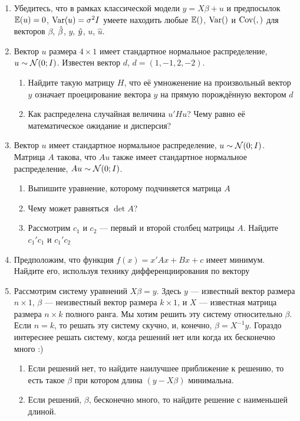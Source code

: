 \documentclass[12pt, a4paper]{article}\usepackage[]{graphicx}\usepackage[]{color}
\begin{document}
\begin{enumerate}

\item Убедитесь, что в рамках классической модели $y=X\beta + u$ и предпосылок $\mathbb{E}(u) = 0$, $\operatorname{Var}(u) = \sigma^2 I$  умеете находить любые $\mathbb{E}()$, $\operatorname{Var}()$ и $\operatorname{Cov}(,)$ для векторов $\beta$, $\hat{\beta}$, $y$, $\hat{y}$, $u$, $\hat u$.

\item Вектор $u$ размера $4 \times 1$ имеет стандартное нормальное распределение, $u \sim \mathcal{N} (0; I)$. Известен вектор $d$, $d=(1, -1, 2, -2)$.

\begin{enumerate}
  \item Найдите такую матрицу $H$, что её умноженение на произвольный вектор $y$ означает проецирование вектора $y$ на прямую порождённую вектором $d$
  \item Как распределена случайная величина $u' H u$? Чему равно её математическое ожидание и дисперсия?
\end{enumerate}

\item Вектор $u$ имеет стандартное нормальное распределение, $u \sim \mathcal{N} (0; I)$. Матрица $A$ такова, что $Au$ также имеет стандартное нормальное распределение, $Au \sim \mathcal{N}(0;I)$.
\begin{enumerate}
  \item Выпишите уравнение, которому подчиняется матрица $A$
  \item Чему может равняться $\det A$?
  \item Рассмотрим $c_1$ и $c_2$ — первый и второй столбец матрицы $A$. Найдите $c_1'c_1$ и $c_1'c_2$
\end{enumerate}

\item Предположим, что функция $f(x) = x'Ax + Bx + c$ имеет минимум. Найдите его, используя технику дифференциирования по вектору

\item Рассмотрим систему уравнений $X\beta = y$. Здесь $y$ — известный вектор размера $n\times 1$, $\beta$ — неизвестный вектор размера $k\times 1$, и $X$ — известная матрица размера $n\times k$ полного ранга. Мы хотим решить эту систему относительно $\beta$. Если $n=k$, то решать эту систему скучно, и, конечно, $\beta = X^{-1}y$. Гораздо интереснее решать систему, когда решений нет или когда их бесконечно много :)

\begin{enumerate}
\item Если решений нет, то найдите наилучшее приближение к решению, то есть такое $\beta$ при котором длина $(y-X\beta)$ минимальна.
\item Если решений, $\beta$, бесконечно много, то найдите решение с наименьшей длиной.
\end{enumerate}


\end{enumerate}
\end{document}
